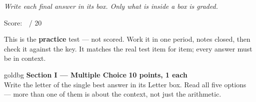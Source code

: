 \documentclass[12pt]{article}
\begin{document}
{\small\itshape Write each final answer in its box. Only what is inside a box is graded.}\par

{\small\hfill Score:\ \blank{1.4cm}\ / 20}

\vspace{0.06in}

\boxguard[8]
\begin{remindbox}
\small
This is the \textbf{practice} test --- not scored. Work it in one period, notes closed, then check
it against the key. It matches the real test item for item; every answer must be in context.
\end{remindbox}

\vspace{0.10in}

\boxguard[16]
\begin{headlinebox}{goldbg}
\small
\textbf{Section I --- Multiple Choice} \hfill \textbf{10 points, 1 each}\\
Write the letter of the single best answer in its Letter box. Read all five options --- more than one of them is about the
context, not just the arithmetic.
\end{headlinebox}

\vspace{0.10in}
\end{document}
